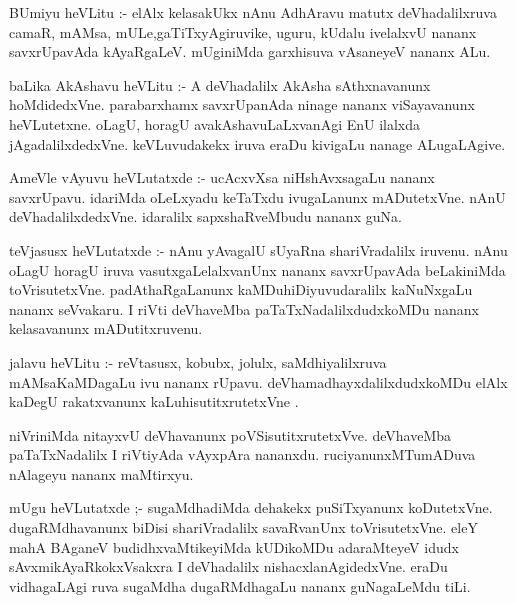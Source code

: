 \documentclass{article}
\begin{document}
\begin{mn}
BUmiyu heVLitu :- elAlx kelasakUkx nAnu AdhAravu matutx deVhadalilxruva
 camaR, mAMsa, mULe,gaTiTxyAgiruvike, uguru, kUdalu ivelalxvU nananx savxrUpavAda
 kAyaRgaLeV.  mUginiMda garxhisuva vAsaneyeV nananx ALu.
\end{mn}

\begin{mn}
baLika AkAshavu heVLitu :- A deVhadalilx AkAsha sAthxnavanunx hoMdidedxVne.
parabarxhamx savxrUpanAda ninage nananx viSayavanunx heVLutetxne. oLagU, 
horagU avakAshavuLaLxvanAgi EnU ilalxda jAgadalilxdedxVne. keVLuvudakekx
iruva eraDu kivigaLu nanage ALugaLAgive.  
\end{mn}

\begin{mn}
AmeVle vAyuvu heVLutatxde :- ucAcxvXsa niHshAvxsagaLu nananx savxrUpavu.  
idariMda oLeLxyadu keTaTxdu ivugaLanunx mADutetxVne. nAnU deVhadalilxdedxVne.
idaralilx sapxshaRveMbudu nananx guNa.
\end{mn}

\begin{mn}
teVjasusx heVLutatxde :- nAnu yAvagalU sUyaRna shariVradalilx iruvenu. nAnu oLagU 
horagU iruva vasutxgaLelalxvanUnx nananx savxrUpavAda beLakiniMda toVrisutetxVne.
 padAthaRgaLanunx kaMDuhiDiyuvudaralilx kaNuNxgaLu nananx seVvakaru. I riVti
 deVhaveMba paTaTxNadalilxdudxkoMDu nananx kelasavanunx mADutitxruvenu.
\end{mn}

\begin{mn}
jalavu heVLitu :- reVtasusx, kobubx, jolulx, saMdhiyalilxruva mAMsaKaMDagaLu
ivu nananx rUpavu.  deVhamadhayxdalilxdudxkoMDu elAlx  kaDegU rakatxvanunx
 kaLuhisutitxrutetxVne . 
\end{mn}

\begin{mn}
niVriniMda nitayxvU  deVhavanunx poVSisutitxrutetxVve. deVhaveMba paTaTxNadalilx
I riVtiyAda vAyxpAra nananxdu.  ruciyanunxMTumADuva nAlageyu nananx maMtirxyu.
\end{mn}

\begin{mn}
mUgu heVLutatxde ;- sugaMdhadiMda dehakekx puSiTxyanunx  koDutetxVne. dugaRMdhavanunx 
biDisi shariVradalilx savaRvanUnx toVrisutetxVne. eleY mahA BAganeV budidhxvaMtikeyiMda
kUDikoMDu adaraMteyeV idudx sAvxmikAyaRkokxVsakxra I deVhadalilx nishacxlanAgidedxVne.
eraDu vidhagaLAgi    ruva sugaMdha dugaRMdhagaLu nananx guNagaLeMdu tiLi.
\end{mn}
\end{document}
